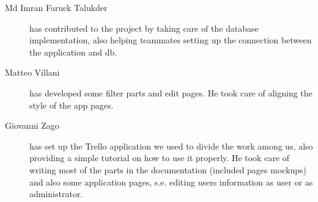 \begin{description}
    \item[Md Imran Faruck Talukder] has contributed to the project by taking care of the database implementation, also helping teammates setting up the connection between the application and db.
    \item[Matteo Villani] has developed some filter parts and edit pages. He took care of aligning the style of the app pages.
    \item[Giovanni Zago] has set up the Trello application we used to divide the work among us, also providing a simple tutorial on how to use it properly. He took care of writing most of the parts in the documentation (included pages mockups) and also some application pages, s.e. editing users information as user or as administrator.
\end{description}